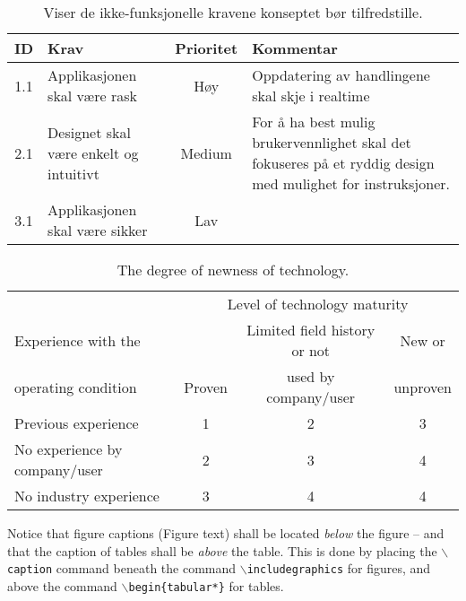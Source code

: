 \begin{table}[htbp]
    \centering
    \caption{Viser de ikke-funksjonelle kravene konseptet bør tilfredstille.}\label{tab:ikke-funksjonelle_krav}
    \begin{tabular}{c|p{}|c|p{}}
    \textbf{ID} & \textbf{Krav} & \textbf{Prioritet} & \textbf{Kommentar} \\ \hline
         1.1 & Applikasjonen skal være rask & Høy & Oppdatering av handlingene skal skje i realtime \\  \hline
         2.1 & Designet skal være enkelt og intuitivt & Medium & For å ha best mulig brukervennlighet skal det fokuseres på et ryddig design med mulighet for instruksjoner. \\ \hline
         3.1 & Applikasjonen skal være sikker & Lav & \\ \hline
    \end{tabular}
\end{table}


\begin{table}
\centering\small
\caption{The degree of newness of technology.}
\label{tab1}
    \begin{tabular*}{\textwidth}{@{\extracolsep{\fill}}lccc}
		\toprule
		  &\multicolumn{3}{c}{Level of technology maturity}\\
\cmidrule{2-4}
		Experience with the		   &  & Limited field history or not & New or \\
          operating  condition  & Proven &  used by company/user & unproven \\
    
		\midrule
		  Previous experience & 1 & 2 & 3 \\
	          No experience by company/user & 2 & 3 & 4 \\
	          No industry experience & 3 & 4 & 4 \\
		\bottomrule
    \end{tabular*}
\end{table}

\begin{remark}
Notice that figure captions (Figure text) shall be located \emph{below} the figure -- and that the caption of tables shall be \emph{above} the table. This is done by placing the $\backslash$\texttt{caption} command beneath the command $\backslash$\texttt{includegraphics} for figures, and above the command $\backslash$\texttt{begin\{tabular*\}} for tables.
\end{remark}